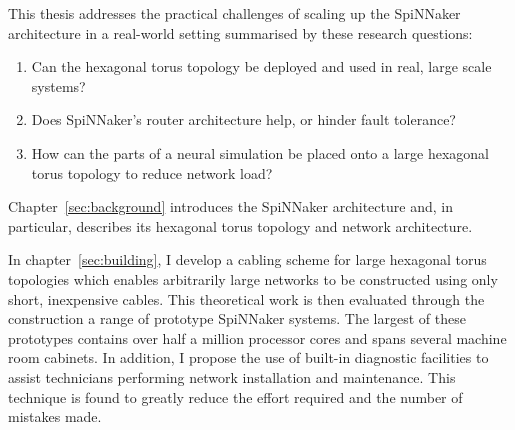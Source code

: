 This thesis addresses the practical challenges of scaling up the SpiNNaker
architecture in a real-world setting summarised by these research questions:

\begin{enumerate}
	
	\item Can the hexagonal torus topology be deployed and used in real, large
	scale systems?
	
	\item Does SpiNNaker's router architecture help, or hinder fault tolerance?
	
	\item How can the parts of a neural simulation be placed onto a large
	hexagonal torus topology to reduce network load?
	
\end{enumerate}

%

Chapter~\ref{sec:background} introduces the SpiNNaker architecture and, in
particular, describes its hexagonal torus topology and network architecture.

In chapter~\ref{sec:building}, I develop a cabling scheme for large hexagonal
torus topologies which enables arbitrarily large networks to be constructed
using only short, inexpensive cables. This theoretical work is then evaluated
through the construction a range of prototype SpiNNaker systems. The largest of
these prototypes contains over half a million processor cores and spans several
machine room cabinets. In addition, I propose the use of built-in diagnostic
facilities to assist technicians performing network installation and
maintenance. This technique is found to greatly reduce the effort required and
the number of mistakes made.

